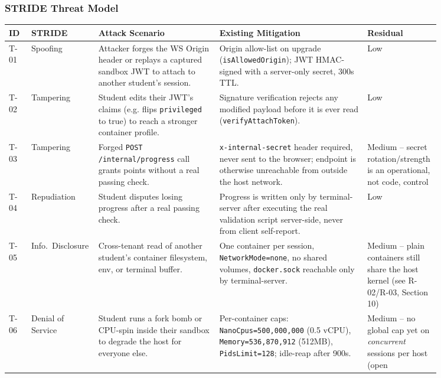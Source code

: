 \documentclass[11pt]{article}
\begin{document}
\subsubsection{STRIDE Threat Model}
\begin{longtable}{@{}p{0.05\linewidth}p{0.09\linewidth}p{0.27\linewidth}p{0.33\linewidth}p{0.11\linewidth}@{}}
\toprule
\textbf{ID} & \textbf{STRIDE} & \textbf{Attack Scenario} & \textbf{Existing Mitigation} & \textbf{Residual} \\
\midrule
\endhead
T-01 & Spoofing & Attacker forges the WS Origin header or replays a
       captured sandbox JWT to attach to another student's session. &
       Origin allow-list on upgrade (\texttt{isAllowedOrigin}); JWT
       HMAC-signed with a server-only secret, 300s TTL. & Low \\
T-02 & Tampering & Student edits their JWT's claims (e.g. flips
       \texttt{privileged} to true) to reach a stronger container
       profile. & Signature verification rejects any modified
       payload before it is ever read (\texttt{verifyAttachToken}). &
       Low \\
T-03 & Tampering & Forged \texttt{POST /internal/progress} call
       grants points without a real passing check. &
       \texttt{x-internal-secret} header required, never sent to the
       browser; endpoint is otherwise unreachable from outside the
       host network. & Medium -- secret rotation/strength is an
       operational, not code, control \\
T-04 & Repudiation & Student disputes losing progress after a real
       passing check. & Progress is written only by terminal-server
       after executing the real validation script server-side, never
       from client self-report. & Low \\
T-05 & Info.\ Disclosure & Cross-tenant read of another student's
       container filesystem, env, or terminal buffer. & One
       container per session, \texttt{NetworkMode=none}, no shared
       volumes, \texttt{docker.sock} reachable only by
       terminal-server. & Medium -- plain containers still share the
       host kernel (see R-02/R-03, Section 10) \\
T-06 & Denial of Service & Student runs a fork bomb or CPU-spin
       inside their sandbox to degrade the host for everyone else. &
       Per-container caps: \texttt{NanoCpus=500{,}000{,}000} (0.5
       vCPU), \texttt{Memory=536{,}870{,}912} (512MB),
       \texttt{PidsLimit=128}; idle-reap after 900s. & Medium -- no
       global cap yet on \emph{concurrent} sessions per host (open

\end{longtable}
\end{document}
